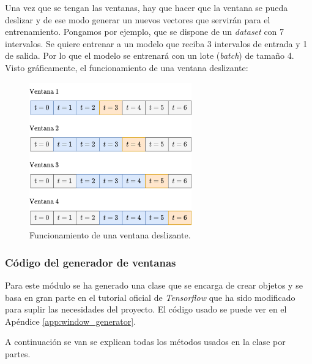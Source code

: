 Una vez que se tengan las ventanas, hay que hacer que la ventana se pueda deslizar y de ese modo generar un nuevos vectores que servirán para el entrenamiento. Pongamos por ejemplo, que se dispone de un \textit{dataset} con 7 intervalos. Se quiere entrenar a un modelo que reciba 3 intervalos de entrada y 1 de salida. Por lo que el modelo se entrenará con un lote (\textit{batch}) de tamaño 4. Visto gráficamente, el funcionamiento de una ventana deslizante:

\begin{figure}[H]
    \centering
    \includegraphics[width=7cm]{images/solution/modules/windows/sliding-windows.png}
    \caption{Funcionamiento de una ventana deslizante.}
\end{figure}


\subsubsection{Código del generador de ventanas}\label{window-generator-code}

Para este módulo se ha generado una clase que se encarga de crear objetos y se basa en gran parte en el tutorial oficial de \textit{Tensorflow} \cite{tensorflow2015-whitepaper} que ha sido modificado para suplir las necesidades del proyecto. El código usado se puede ver en el Apéndice \ref{app:window_generator}.
\newline

A continuación se van se explican todas los métodos usados en la clase por partes.


